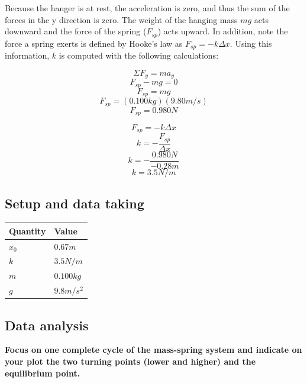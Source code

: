 \documentclass[11pt, letterpaper, includehead]{article}
\begin{document}
Because the hanger is at rest, the acceleration is zero, and thus the sum of the forces in the y
direction is zero. The weight of the hanging mass $mg$ acts downward and the force of the spring
($F_{sp}$) acts upward. In addition, note the force a spring exerts is defined by Hooke's law as $F_{sp} = -k \Delta x$. 
Using this information, $k$ is computed with the following calculations:
\begin{multicols}{2}
$$\Sigma F_y = ma_y$$
$$F_{sp} - mg = 0$$
$$F_{sp} = mg$$
$$F_{sp} = (0.100kg)(9.80m/s)$$
$$\boxed{F_{sp} = 0.980 N}$$

\columnbreak

$$F_{sp} = -k \Delta x$$
$$k = -\frac{F_{sp}}{\Delta x}$$
$$k = -\frac{0.980 N}{-0.28m}$$
$$\boxed{k = 3.5N/m}$$
\end{multicols}

\subsection{Setup and data taking}
\begin{center} 
  \begin{tabular}{| m{3cm} |  m{3cm} |} 
    \hline
     \textbf{Quantity} & \textbf{Value}\\ 
      \hline
      $x_0$ & $0.67m$ \\ 
      \hline
      $k$ & $3.5N/m$ \\ 
      \hline
      $m$ & $0.100kg$\\
      \hline
      $g$ & $9.8 m/s^2$\\
      \hline
  \end{tabular} 
\end{center}

\pagebreak

\subsection{Data analysis}
\textbf{Focus on one complete cycle of the mass-spring system and indicate 
on your plot the two turning points (lower and higher) and the equilibrium point.}\\
\end{document}

